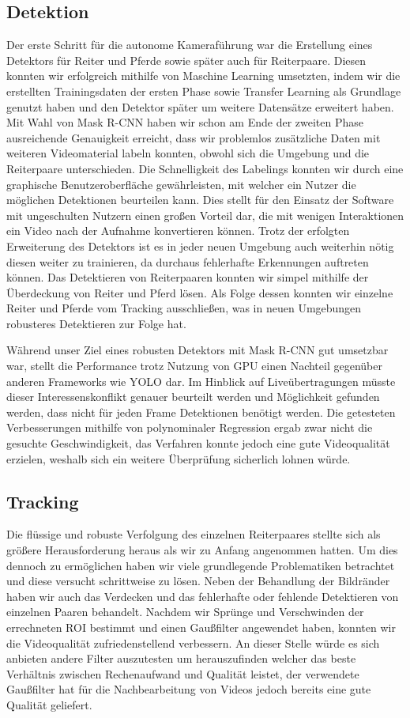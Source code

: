 \subsection*{Detektion}
Der erste Schritt für die autonome Kameraführung war die Erstellung eines Detektors für Reiter und Pferde sowie später auch für Reiterpaare. Diesen konnten wir erfolgreich mithilfe von Maschine Learning umsetzten, indem wir die erstellten Trainingsdaten der ersten Phase sowie Transfer Learning als Grundlage genutzt haben und den Detektor später um weitere Datensätze erweitert haben. Mit Wahl von Mask R-CNN haben wir schon am Ende der zweiten Phase ausreichende Genauigkeit erreicht, dass wir problemlos zusätzliche Daten mit weiteren Videomaterial labeln konnten, obwohl sich die Umgebung und die Reiterpaare unterschieden. Die Schnelligkeit des Labelings konnten wir durch eine graphische Benutzeroberfläche gewährleisten, mit welcher ein Nutzer die möglichen Detektionen  beurteilen kann. Dies stellt für den Einsatz der Software mit ungeschulten Nutzern einen großen Vorteil dar, die mit wenigen Interaktionen ein Video nach der Aufnahme konvertieren können. Trotz der erfolgten Erweiterung des Detektors ist es in jeder neuen Umgebung auch weiterhin nötig diesen weiter zu trainieren, da durchaus fehlerhafte Erkennungen auftreten können.
Das Detektieren von Reiterpaaren konnten wir simpel mithilfe der Überdeckung von Reiter und Pferd lösen. Als Folge dessen konnten wir einzelne Reiter und Pferde vom Tracking ausschließen, was in neuen Umgebungen robusteres Detektieren zur Folge hat.

Während unser Ziel eines robusten Detektors mit Mask R-CNN gut umsetzbar war, stellt die Performance trotz Nutzung von GPU einen Nachteil gegenüber anderen Frameworks wie YOLO dar. Im Hinblick auf Liveübertragungen müsste dieser Interessenskonflikt genauer beurteilt werden und Möglichkeit gefunden werden, dass nicht für jeden Frame Detektionen benötigt werden. Die getesteten Verbesserungen mithilfe von polynominaler Regression ergab zwar nicht die gesuchte Geschwindigkeit, das Verfahren konnte jedoch eine gute Videoqualität erzielen, weshalb sich ein weitere Überprüfung sicherlich lohnen würde.


\subsection*{Tracking}
Die flüssige und robuste Verfolgung des einzelnen Reiterpaares stellte sich als größere Herausforderung heraus als wir zu Anfang angenommen hatten. Um dies dennoch zu ermöglichen haben wir viele grundlegende Problematiken betrachtet und diese versucht schrittweise zu lösen. 
Neben der Behandlung der Bildränder haben wir auch das Verdecken und das fehlerhafte oder fehlende Detektieren von einzelnen Paaren behandelt. Nachdem wir Sprünge und Verschwinden der errechneten ROI bestimmt und einen Gaußfilter angewendet haben, konnten wir die Videoqualität zufriedenstellend verbessern. An dieser Stelle würde es sich anbieten andere Filter auszutesten um herauszufinden welcher das beste Verhältnis zwischen Rechenaufwand und Qualität leistet, der verwendete Gaußfilter hat für die Nachbearbeitung von Videos jedoch bereits eine gute Qualität geliefert.

